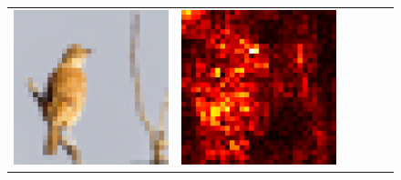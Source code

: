 \documentclass[preprint,12pt]{elsarticle}
\begin{document}
\begin{figure}[p]
\begin{tabular}{cccccc}
  \includegraphics[scale=\scale]{../visualizations/examples/cifar10/cnn/images/2.png} &
  \includegraphics[scale=\scale]{../visualizations/examples/cifar10/cnn/saliency_map/2.png} & 

\end{tabular}
\end{figure}
\end{document}
